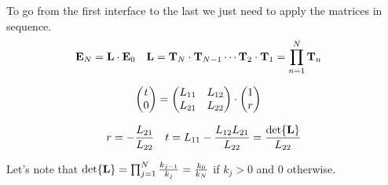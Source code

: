 To go from the first interface to the last we just need to apply the matrices in sequence.
\begin{align*}
	\vb{E}_N &= \vb{L}\cdot\vb{E}_0 & \vb{L} &= \vb{T}_N\cdot\vb{T}_{N-1}\cdots\vb{T}_2\cdot\vb{T}_{1} = \prod_{n=1}^N \vb{T}_n 
\end{align*}

\begin{align*}
	\pmqty{t\\ 0} &= \pmqty{L_{11} & L_{12}\\L_{21}&L_{22}}\cdot\pmqty{1\\r}
\end{align*}

\begin{align*}
	r &= -\frac{L_{21}}{L_{22}} & t = L_{11} - \frac{L_{12}L_{21}}{L_{22}}  = \frac{\det{\vb{L}}}{L_{22}}
\end{align*}

Let's note that $\det{\vb{L}} = \prod_{j=1}^N\frac{k_{j-1}}{k_{j}} = \frac{k_0}{k_N}$ if $k_j > 0$ and $0$ otherwise.







